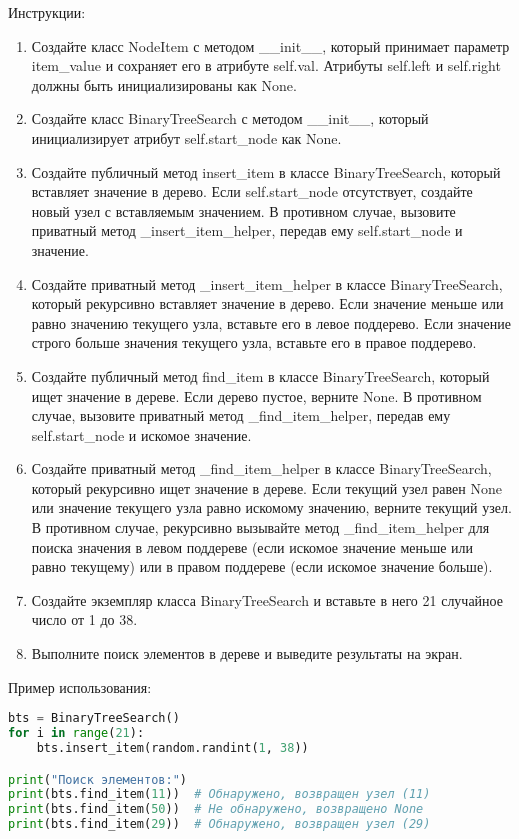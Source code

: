 \begin{enumerate}
Инструкции:
\begin{enumerate}
    \item Создайте класс NodeItem с методом \_\_init\_\_, который принимает параметр item\_value и сохраняет его в атрибуте self.val. Атрибуты self.left и self.right должны быть инициализированы как None.
    \item Создайте класс BinaryTreeSearch с методом \_\_init\_\_, который инициализирует атрибут self.start\_node как None.
    \item Создайте публичный метод insert\_item в классе BinaryTreeSearch, который вставляет значение в дерево. Если self.start\_node отсутствует, создайте новый узел с вставляемым значением. В противном случае, вызовите приватный метод \_insert\_item\_helper, передав ему self.start\_node и значение.
    \item Создайте приватный метод \_insert\_item\_helper в классе BinaryTreeSearch, который рекурсивно вставляет значение в дерево. Если значение меньше или равно значению текущего узла, вставьте его в левое поддерево. Если значение строго больше значения текущего узла, вставьте его в правое поддерево.
    \item Создайте публичный метод find\_item в классе BinaryTreeSearch, который ищет значение в дереве. Если дерево пустое, верните None. В противном случае, вызовите приватный метод \_find\_item\_helper, передав ему self.start\_node и искомое значение.
    \item Создайте приватный метод \_find\_item\_helper в классе BinaryTreeSearch, который рекурсивно ищет значение в дереве. Если текущий узел равен None или значение текущего узла равно искомому значению, верните текущий узел. В противном случае, рекурсивно вызывайте метод \_find\_item\_helper для поиска значения в левом поддереве (если искомое значение меньше или равно текущему) или в правом поддереве (если искомое значение больше).
    \item Создайте экземпляр класса BinaryTreeSearch и вставьте в него 21 случайное число от 1 до 38.
    \item Выполните поиск элементов в дереве и выведите результаты на экран.
\end{enumerate}

Пример использования:
\begin{lstlisting}[language=Python]
bts = BinaryTreeSearch()
for i in range(21):
    bts.insert_item(random.randint(1, 38))

print("Поиск элементов:")
print(bts.find_item(11))  # Обнаружено, возвращен узел (11)
print(bts.find_item(50))  # Не обнаружено, возвращено None
print(bts.find_item(29))  # Обнаружено, возвращен узел (29)
\end{lstlisting}


\end{enumerate}

